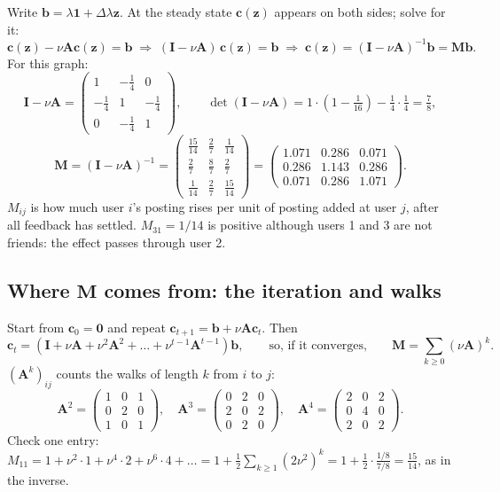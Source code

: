 \documentclass[11pt]{article}
\newcommand{\one}{\mathbf{1}}
\newcommand{\vzero}{\mathbf{0}}
\newcommand{\vc}{\boldsymbol{c}}
\newcommand{\vz}{\boldsymbol{z}}
\newcommand{\vb}{\boldsymbol{b}}
\newcommand{\mA}{\mathbf{A}}
\newcommand{\mM}{\mathbf{M}}
\newcommand{\mI}{\mathbf{I}}
\begin{document}
Write $\vb = \lambda\one + \Delta\lambda \vz$.  At the steady state $\vc(\vz)$ appears on both sides; solve for it:
\[
\vc(\vz) - \nu \mA \vc(\vz) = \vb
\;\Longrightarrow\;
(\mI - \nu \mA)\, \vc(\vz) = \vb
\;\Longrightarrow\;
\vc(\vz) = (\mI - \nu \mA)^{-1} \vb = \mM \vb .
\]
For this graph:
\[
\mI - \nu \mA = \begin{pmatrix} 1 & -\tfrac14 & 0 \\ -\tfrac14 & 1 & -\tfrac14 \\ 0 & -\tfrac14 & 1 \end{pmatrix},
\qquad
\det(\mI - \nu \mA) = 1\cdot\left(1 - \tfrac1{16}\right) - \tfrac14\cdot\tfrac14 = \tfrac78 ,
\]
\[
\mM = (\mI - \nu \mA)^{-1} =
\begin{pmatrix} \tfrac{15}{14} & \tfrac27 & \tfrac1{14} \\[2pt] \tfrac27 & \tfrac87 & \tfrac27 \\[2pt] \tfrac1{14} & \tfrac27 & \tfrac{15}{14} \end{pmatrix}
=
\begin{pmatrix} 1.071 & 0.286 & 0.071 \\ 0.286 & 1.143 & 0.286 \\ 0.071 & 0.286 & 1.071 \end{pmatrix}.
\]
$M_{ij}$ is how much user $i$'s posting rises per unit of posting added at user $j$, after all feedback has settled.  $M_{31} = 1/14$ is positive although users 1 and 3 are not friends: the effect passes through user 2.

\subsection{Where $\mM$ comes from: the iteration and walks}

Start from $\vc_0 = \vzero$ and repeat $\vc_{t+1} = \vb + \nu \mA \vc_t$.  Then
\[
\vc_t = \left(\mI + \nu \mA + \nu^2 \mA^2 + \dots + \nu^{t-1} \mA^{t-1}\right) \vb ,
\qquad\text{so, if it converges,}\qquad
\mM = \sum_{k \ge 0} (\nu \mA)^k .
\]
$(\mA^k)_{ij}$ counts the walks of length $k$ from $i$ to $j$:
\[
\mA^2 = \begin{pmatrix} 1 & 0 & 1 \\ 0 & 2 & 0 \\ 1 & 0 & 1 \end{pmatrix},\quad
\mA^3 = \begin{pmatrix} 0 & 2 & 0 \\ 2 & 0 & 2 \\ 0 & 2 & 0 \end{pmatrix},\quad
\mA^4 = \begin{pmatrix} 2 & 0 & 2 \\ 0 & 4 & 0 \\ 2 & 0 & 2 \end{pmatrix}.
\]
Check one entry: $M_{11} = 1 + \nu^2\cdot 1 + \nu^4 \cdot 2 + \nu^6 \cdot 4 + \dots = 1 + \tfrac12 \sum_{k\ge1} (2\nu^2)^k = 1 + \tfrac12\cdot\tfrac{1/8}{7/8} = \tfrac{15}{14}$, as in the inverse.
\end{document}
